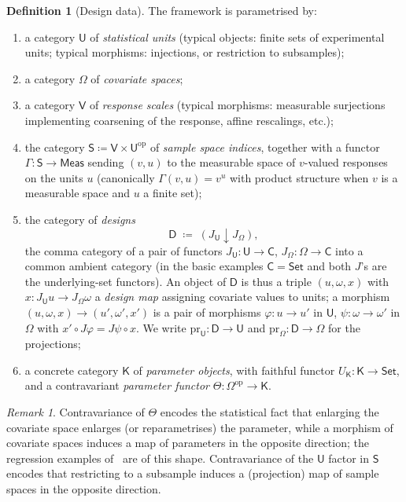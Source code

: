 \documentclass[11pt,a4paper]{article}
\theoremstyle{plain}
\theoremstyle{definition}
\newtheorem{definition}[theorem]{Definition}
\theoremstyle{remark}
\newtheorem{remark}[theorem]{Remark}
\newcommand{\cat}[1]{\mathsf{#1}}
\newcommand{\catU}{\cat{U}}
\newcommand{\catV}{\cat{V}}
\newcommand{\catO}{\cat{\Omega}}
\newcommand{\catS}{\cat{S}}
\newcommand{\catD}{\cat{D}}
\newcommand{\catK}{\cat{K}}
\newcommand{\Meas}{\cat{Meas}}
\newcommand{\Set}{\cat{Set}}
\newcommand{\op}{\mathrm{op}}
\newcommand{\pr}{\mathrm{pr}}
\begin{document}
\begin{definition}[Design data]\label{def:designdata}
The framework is parametrised by:
\begin{enumerate}
\item a category $\catU$ of \emph{statistical units} (typical objects: finite
sets of experimental units; typical morphisms: injections, or restriction to
subsamples);
\item a category $\catO$ of \emph{covariate spaces};
\item a category $\catV$ of \emph{response scales} (typical morphisms:
measurable surjections implementing coarsening of the response, affine
rescalings, etc.);
\item the category $\catS \coloneqq \catV \times \catU^{\op}$ of \emph{sample
space indices}, together with a functor $\Gamma \colon \catS \to \Meas$ sending
$(v,u)$ to the measurable space of $v$-valued responses on the units $u$
(canonically $\Gamma(v,u) = v^{u}$ with product structure when $v$ is a measurable
space and $u$ a finite set);
\item the category of \emph{designs}
\[
\catD \;\coloneqq\; (J_{\catU} \downarrow J_{\catO}),
\]
the comma category of a pair of functors $J_{\catU}\colon \catU \to \cat{C}$,
$J_{\catO} \colon \catO \to \cat{C}$ into a common ambient category (in the
basic examples $\cat{C} = \Set$ and both $J$'s are the underlying-set
functors). An object of $\catD$ is thus a triple $(u, \omega, x)$ with
$x \colon J_\catU u \to J_\catO \omega$ a \emph{design map} assigning
covariate values to units; a morphism
$(u,\omega,x) \to (u',\omega',x')$ is a pair of morphisms
$\varphi \colon u \to u'$ in $\catU$, $\psi \colon \omega \to \omega'$ in
$\catO$ with $x' \circ J\varphi = J\psi \circ x$. We write
$\pr_{\catU} \colon \catD \to \catU$ and
$\pr_{\catO} \colon \catD \to \catO$ for the projections;
\item a concrete category $\catK$ of \emph{parameter objects}, with faithful
functor $U_{\catK} \colon \catK \to \Set$, and a contravariant \emph{parameter
functor} $\Theta \colon \catO^{\op} \to \catK$.
\end{enumerate}
\end{definition}

\begin{remark}
Contravariance of $\Theta$ encodes the statistical fact that enlarging the
covariate space enlarges (or reparametrises) the parameter, while a morphism
of covariate spaces induces a map of parameters in the opposite direction; the
regression examples of~\cite[\S6]{mccullagh_what_2002} are of this shape.
Contravariance of the $\catU$ factor in $\catS$ encodes that restricting to a
subsample induces a (projection) map of sample spaces in the opposite
direction.
\end{remark}
\end{document}
